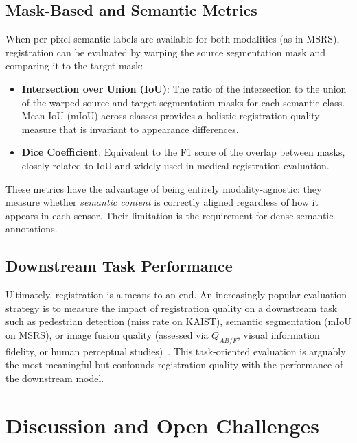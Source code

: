 \subsection{Mask-Based and Semantic Metrics}
\label{subsec:mask-based}

When per-pixel semantic labels are available for both modalities (as in MSRS),
registration can be evaluated by warping the source segmentation mask and
comparing it to the target mask:

\begin{itemize}
  \item \textbf{Intersection over Union (IoU)}: The ratio of the intersection
    to the union of the warped-source and target segmentation masks for each
    semantic class. Mean IoU (mIoU) across classes provides a holistic
    registration quality measure that is invariant to appearance differences.
  \item \textbf{Dice Coefficient}: Equivalent to the F1 score of the overlap
    between masks, closely related to IoU and widely used in medical
    registration evaluation.
\end{itemize}

These metrics have the advantage of being entirely modality-agnostic: they
measure whether \emph{semantic content} is correctly aligned regardless of
how it appears in each sensor. Their limitation is the requirement for dense
semantic annotations.

\subsection{Downstream Task Performance}
\label{subsec:downstream}

Ultimately, registration is a means to an end. An increasingly popular
evaluation strategy is to measure the impact of registration quality on a
downstream task such as pedestrian detection (miss rate on KAIST), semantic
segmentation (mIoU on MSRS), or image fusion quality (assessed via
$Q_{AB/F}$, visual information fidelity, or human perceptual
studies)~\cite{tang2022piafusion}. This task-oriented evaluation is arguably
the most meaningful but confounds registration quality with the performance
of the downstream model.


\section{Discussion and Open Challenges}
\label{sec:discussion}

